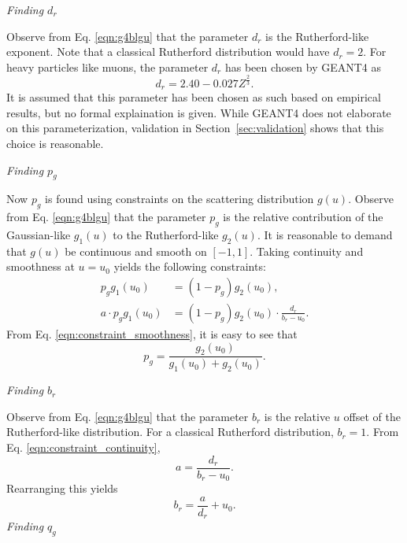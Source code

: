 \noindent \textit{\large{Finding $d_r$}}


Observe from Eq. \eqref{eqn:g4blgu} that the parameter $d_r$ is the Rutherford-like exponent. Note that a classical Rutherford distribution would have $d_r=2$. For heavy particles like muons, the parameter $d_r$ has been chosen by GEANT4 \cite{geant4} as
\begin{equation}
d_r=2.40-0.027Z^{\frac{2}{3}}.
\label{eqn:geantd}
\end{equation}
It is assumed that this parameter has been chosen as such based on empirical results, but no formal explaination is given. While GEANT4 \cite{geant4} does not elaborate on this parameterization, validation in Section~\ref{sec:validation} shows that this choice is reasonable.

\noindent \textit{\large{Finding $p_g$}}

Now $p_g$ is found using constraints on the scattering distribution $g(u)$. Observe from Eq. \eqref{eqn:g4blgu} that the parameter $p_g$ is the relative contribution of the Gaussian-like $g_1(u)$ to the Rutherford-like $g_2(u)$. It is reasonable to demand that $g(u)$ be continuous and smooth on $[-1,1]$. Taking continuity and smoothness at $u=u_0$ yields the following constraints:
%
\begin{align}
p_g g_1(u_0)&=(1-p_g)g_2(u_0), \label{eqn:constraint_smoothness}\\
a\cdot p_g g_1(u_0)&=(1-p_g)g_2(u_0)\cdot\frac{d_r}{b_r-u_0}. \label{eqn:constraint_continuity}
\end{align}
%
From Eq. \eqref{eqn:constraint_smoothness}, it is easy to see that
%
\begin{equation}
p_g=\frac{g_2(u_0)}{g_1(u_0)+g_2(u_0)}.
\label{eqn:geantp}
\end{equation}
%

\noindent \textit{\large{Finding $b_r$}}

Observe from Eq. \eqref{eqn:g4blgu} that the parameter $b_r$ is the relative $u$ offset of the Rutherford-like distribution. For a classical Rutherford distribution, $b_r=1$. From Eq. \eqref{eqn:constraint_continuity},
%
\begin{equation}\nonumber
a=\frac{d_r}{b_r-u_0}.
\end{equation}
%
Rearranging this yields
%
\begin{equation}
b_r=\frac{a}{d_r}+u_0.
\label{eqn:geantb}
\end{equation}
%
\noindent \textit{\large{Finding $q_g$}}

